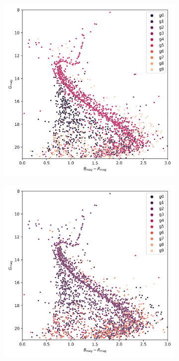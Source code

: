 \documentclass[11pt,a4paper,english,twocolumn]{article}
\begin{document}
\begin{figure}[!hbt]
  \begin{subfigure}{0.3\textwidth}
    \includegraphics[width=\textwidth]{../figures/ngc_2682/kmeans_hr_diagram_ngc_2682.png}
  \end{subfigure}
  \begin{subfigure}{0.3\textwidth}
    \includegraphics[width=\textwidth]{../figures/ngc_2682/dec_hr_diagram_ngc_2682.png}

\end{subfigure}
\end{figure}
\end{document}
